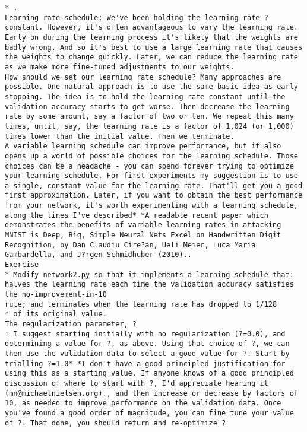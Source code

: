 \begin{lstlisting}
* .
Learning rate schedule: We've been holding the learning rate ?
constant. However, it's often advantageous to vary the learning rate. Early on during the learning process it's likely that the weights are badly wrong. And so it's best to use a large learning rate that causes the weights to change quickly. Later, we can reduce the learning rate as we make more fine-tuned adjustments to our weights.
How should we set our learning rate schedule? Many approaches are possible. One natural approach is to use the same basic idea as early stopping. The idea is to hold the learning rate constant until the validation accuracy starts to get worse. Then decrease the learning rate by some amount, say a factor of two or ten. We repeat this many times, until, say, the learning rate is a factor of 1,024 (or 1,000) times lower than the initial value. Then we terminate.
A variable learning schedule can improve performance, but it also opens up a world of possible choices for the learning schedule. Those choices can be a headache - you can spend forever trying to optimize your learning schedule. For first experiments my suggestion is to use a single, constant value for the learning rate. That'll get you a good first approximation. Later, if you want to obtain the best performance from your network, it's worth experimenting with a learning schedule, along the lines I've described* *A readable recent paper which demonstrates the benefits of variable learning rates in attacking MNIST is Deep, Big, Simple Neural Nets Excel on Handwritten Digit Recognition, by Dan Claudiu Cire?an, Ueli Meier, Luca Maria Gambardella, and J?rgen Schmidhuber (2010)..
Exercise
* Modify network2.py so that it implements a learning schedule that: halves the learning rate each time the validation accuracy satisfies the no-improvement-in-10
rule; and terminates when the learning rate has dropped to 1/128
* of its original value. 
The regularization parameter, ?
: I suggest starting initially with no regularization (?=0.0), and determining a value for ?, as above. Using that choice of ?, we can then use the validation data to select a good value for ?. Start by trialling ?=1.0* *I don't have a good principled justification for using this as a starting value. If anyone knows of a good principled discussion of where to start with ?, I'd appreciate hearing it (mn@michaelnielsen.org)., and then increase or decrease by factors of 10, as needed to improve performance on the validation data. Once you've found a good order of magnitude, you can fine tune your value of ?. That done, you should return and re-optimize ?

\end{lstlisting}
